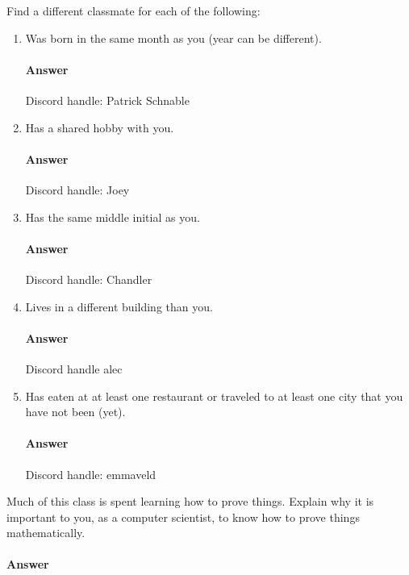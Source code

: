 \documentclass{article}
\begin{document}
Find a different classmate for each of the following:
\begin{enumerate}
    \item Was born in the same month as you (year can be different).
        \paragraph{Answer} Discord handle: Patrick Schnable

    \item Has a shared hobby with you.
        \paragraph{Answer} Discord handle: Joey

    \item Has the same middle initial as you.
        \paragraph{Answer} Discord handle: Chandler

    \item Lives in a different building than you.
        \paragraph{Answer} Discord handle alec

    \item Has eaten at at least one restaurant or traveled to at least one city that you have not been
        (yet).
        \paragraph{Answer} Discord handle: emmaveld

\end{enumerate}


Much of this class is spent learning how to prove things.  Explain why it is
important to you, as a computer scientist, to know how to prove things
mathematically.

\paragraph{Answer}
\end{document}
